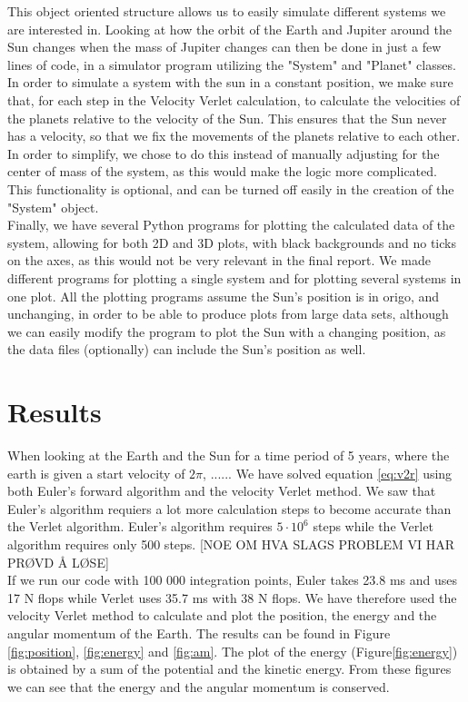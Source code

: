 \documentclass{article}
\begin{document}
        This object oriented structure allows us to easily simulate different systems we are interested in. Looking at how the orbit of the Earth and Jupiter around the Sun changes when the mass of Jupiter changes can then be done in just a few lines of code, in a simulator program utilizing the "System" and "Planet" classes.\\

        In order to simulate a system with the sun in a constant position, we make sure that, for each step in the Velocity Verlet calculation, to calculate the velocities of the planets relative to the velocity of the Sun. This ensures that the Sun never has a velocity, so that we fix the movements of the planets relative to each other. In order to simplify, we chose to do this instead of manually adjusting for the center of mass of the system, as this would make the logic more complicated. This functionality is optional, and can be turned off easily in the creation of the "System" object.\\

        Finally, we have several Python programs for plotting the calculated data of the system, allowing for both 2D and 3D plots, with black backgrounds and no ticks on the axes, as this would not be very relevant in the final report. We made different programs for plotting a single system and for plotting several systems in one plot. All the plotting programs assume the Sun's position is in origo, and unchanging, in order to be able to produce plots from large data sets, although we can easily modify the program to plot the Sun with a changing position, as the data files (optionally) can include the Sun's position as well.


\section{Results}
    When looking at the Earth and the Sun for a time period of 5 years, where the earth is given a start velocity of $2\pi$, ......
    We have solved equation \ref{eq:v2r} using both Euler's forward algorithm and the velocity Verlet method. We saw that Euler's algorithm requiers a lot more calculation steps to become accurate than the Verlet algorithm. Euler's algorithm requires $5 \cdot 10^6$ steps while the Verlet algorithm requires only 500 steps. [NOE OM HVA SLAGS PROBLEM VI HAR PRØVD Å LØSE]\\

    If we run our code with 100 000 integration points, Euler takes 23.8 ms and uses 17 N flops while Verlet uses 35.7 ms with 38 N flops. We have therefore used the velocity Verlet method to calculate and plot the position, the energy and the angular momentum of the Earth. The results can be found in Figure \ref{fig:position}, \ref{fig:energy} and \ref{fig:am}. The plot of the energy (Figure\ref{fig:energy}) is obtained by a sum of the potential and the kinetic energy. From these figures we can see that the energy and the angular momentum is conserved.
\end{document}
